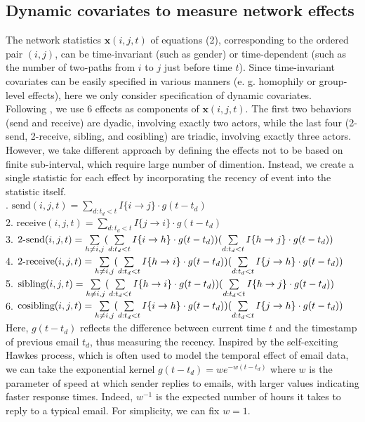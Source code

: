 \documentclass[a4paper]{article}
\begin{document}
\subsection{Dynamic covariates to measure network effects}
The network statistics $\boldsymbol{x}(i, j, t)$ of equations (2), corresponding to the ordered pair $(i, j)$, can be time-invariant (such as gender) or time-dependent (such as the number of two-paths from $i$ to $j$ just before time $t$). Since time-invariant covariates can be easily specified in various manners (e. g. homophily or group-level effects), here we only consider specification of dynamic covariates.\\ \newline
Following \cite{PerryWolfe2012}, we use 6 effects as components of $\boldsymbol{x}(i, j, t)$. The first two behaviors (send and receive) are dyadic, involving exactly two actors,
while the last four (2-send, 2-receive, sibling, and cosibling) are triadic, involving exactly three actors. However, we take different approach by defining the effects not to be based on finite sub-interval, which require large number of dimention. Instead, we create a single statistic for each effect by incorporating the recency of event into the statistic itself. \\ . $\mbox{send}(i, j, t)=\sum\limits_{d: t_d<t} I\{i\rightarrow j\}\cdot g(t-t_d)$\\
2. $\mbox{receive}(i, j, t)=\sum\limits_{d: t_d<t} I\{j\rightarrow i\}\cdot g(t-t_d)$\\
3. $\mbox{2-send}(i, j, t)=\sum\limits_{h \neq i, j}\Large(\sum\limits_{d: t_d<t}  I\{i\rightarrow h\}\cdot g(t-t_d)\Large)\Large(\sum\limits_{d: t_d<t} I\{h\rightarrow j\}\cdot g(t-t_d)\Large)$\\
4. $\mbox{2-receive}(i, j, t)=\sum\limits_{h \neq i, j}\Large(\sum\limits_{d: t_d<t} I\{h\rightarrow i\}\cdot g(t-t_d)\Large)\Large(\sum\limits_{d: t_d<t} I\{j\rightarrow h\}\cdot g(t-t_d)\Large)$\\
5. $\mbox{sibling}(i, j, t)=\sum\limits_{h \neq i, j}\Large(\sum\limits_{d: t_d<t} I\{h\rightarrow i\}\cdot g(t-t_d)\Large)\Large(\sum\limits_{d: t_d<t} I\{h\rightarrow j\}\cdot g(t-t_d)\Large)$\\
6. $\mbox{cosibling}(i, j, t)=\sum\limits_{h \neq i, j}\Large(\sum\limits_{d: t_d<t} I\{i\rightarrow h\}\cdot g(t-t_d)\Large)\Large(\sum\limits_{d: t_d<t} I\{j\rightarrow h\}\cdot g(t-t_d)\Large)$\\\newline
Here, $g(t-t_d)$ reflects the difference between current time $t$ and the timestamp of previous email $t_d$, thus measuring the recency. Inspired by the self-exciting Hawkes process, which is often used to model the temporal effect of email data, we can take the exponential kernel $g(t-t_d)=we^{-w(t-t_d)}$ where $w$ is the parameter of speed at
which sender replies to emails, with larger values indicating faster response times. Indeed, $w^{-1}$ is the expected number of hours it takes to reply to a typical email. For simplicity, we can fix $w=1$.
\end{document}
